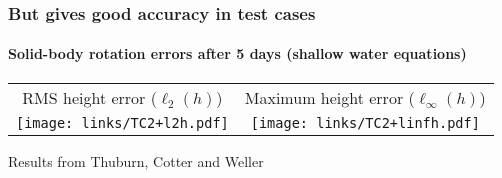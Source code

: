 \begin{frame}
\frametitle{But gives good accuracy in test cases}
\framesubtitle{Solid-body rotation errors after 5 days (shallow water equations)}

\begin{tabular}{cc}
RMS height error ($\ell_2(h)$)
&
Maximum height error ($\ell_\infty(h)$)
\\
\texttt{[image: links/TC2+l2h.pdf]}
&
\texttt{[image: links/TC2+linfh.pdf]}
\end{tabular}

Results from Thuburn, Cotter and Weller

\end{frame}

